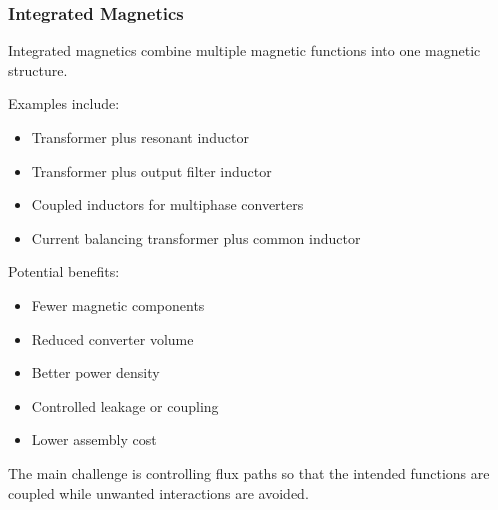 \begin{frame}
    \frametitle{Integrated Magnetics}
            Integrated magnetics combine multiple magnetic functions into one magnetic structure.

            Examples include:
            \begin{itemize}
                \item Transformer plus resonant inductor
                \item Transformer plus output filter inductor
                \item Coupled inductors for multiphase converters
                \item Current balancing transformer plus common inductor
            \end{itemize}

            \vspace{0.15cm}

            Potential benefits:
            \begin{itemize}
                \item Fewer magnetic components
                \item Reduced converter volume
                \item Better power density
                \item Controlled leakage or coupling
                \item Lower assembly cost
            \end{itemize}

            The main challenge is controlling flux paths so that the intended functions are coupled while unwanted interactions are avoided.
\end{frame}


